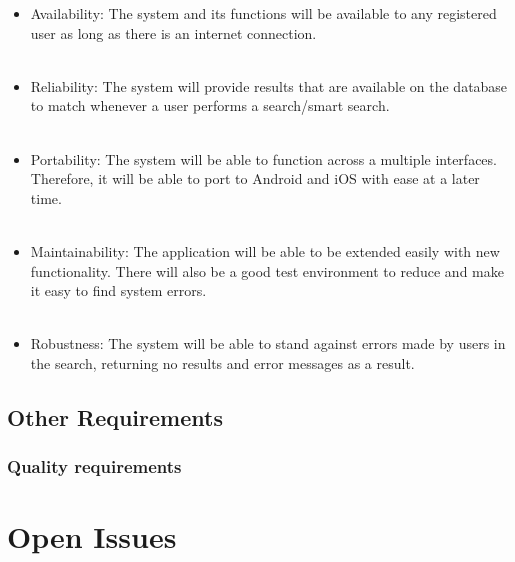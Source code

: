 \documentclass[a4paper,10pt]{article}
\begin{document}
\begin{itemize}
		\begin{itemize}
		\item Availability: The system and its functions will be available to any registered user as long as there is an internet connection. 
\\\\
		\item Reliability: The system will provide results that are available on the database to match whenever a user performs a search/smart search.
\\\\
		\item Portability: The system will be able to function across a multiple interfaces. Therefore, it will be able to port to Android and iOS with ease at a later time. 
\\\\
		\item Maintainability: The application will be able to be extended easily with new functionality. There will also be a good test environment to reduce and make it easy to find system errors.  
\\\\
		\item Robustness: The system will be able to stand against errors made by users in the search, returning no results and error messages as a result.
		\end{itemize}
        
	\subsection{Other Requirements}

\subsubsection{Quality requirements}
\begin{itemize}
	
\end{itemize}


\clearpage

\section{Open Issues}

\end{itemize}
\end{document}
